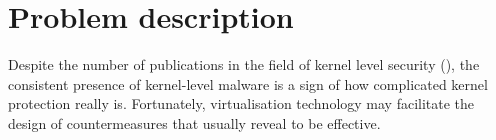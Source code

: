 \section{Problem description}
Despite the number of publications in the field of kernel level security (\cite{rootkitdetection, rootkitdetection2, HookSafe}), the consistent presence of kernel-level malware is a sign of how complicated kernel protection really is. 
Fortunately, virtualisation technology may facilitate the design of countermeasures that usually reveal to be effective. 

